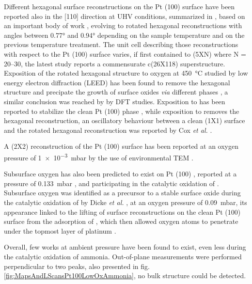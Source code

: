 Different hexagonal surface reconstructions on the Pt (100) surface have been reported also in the [110] direction at UHV conditions, summarized in \cite{Hammer2016}, based on an important body of work \parencite{Heilmann1979, VANHOVE1981, Heinz1982, Mase1992, Kuhnke1992, Borg1994, VanBeurden2004, Havu2010}, evolving to rotated hexagonal reconstructions with angles between \ang{0.77} and \ang{0.94} depending on the sample temperature and on the previous temperature treatment.
The unit cell describing those reconstructions with respect to the Pt (100) surface varies, if first contained to (5XN) where N = 20–30, the latest study reports a commensurate c(26X118) superstructure.
Exposition of the rotated hexagonal structure to oxygen at \qty{450}{\degreeCelsius} studied by low energy electron diffraction (LEED) has been found to remove the hexagonal structure and precipate the growth of surface oxides \textit{via} different phases \parencite{BradleyShumbera2007, BradleyShumbera2007a}, a similar conclusion was reached by \cite{Deskins2005} by DFT studies.
Exposition to  has been reported to stabilize the clean Pt (100) phase \parencite{Heinz1982}, while exposition to  removes the hexagonal reconstruction, an oscillatory behaviour between a clean (1X1) surface and the rotated hexagonal reconstruction was reported by Cox \textit{et al.} \parencite*{Cox1983}.

A (2X2) reconstruction of the Pt (100) surface has been reported at an oxygen pressure of \qty{1e-3}{mbar} by the use of environmental TEM \parencite{Li2016}.

Subsurface oxygen has also been predicted to exist on Pt (100) \parencite{Gu2007}, reported at a pressure of \qty{0.133}{\milli\bar} \parencite{McMillan2005}, and participating in the catalytic oxidation of .
Subsurface oxygen was identified as a precursor to a stable surface oxide during the catalytic oxidation of  by Dicke \textit{et al.} \parencite*{Dicke2000}, at an oxygen pressure of \qty{0.09}{\milli\bar}, its appearance linked to the lifting of surface reconstructions on the clean Pt (100) surface from the adsorption of , which then allowed oxygen atoms to penetrate under the topmost layer of platinum \parencite{Rotermund1993, LAUTERBACH1994}.

Overall, few works at ambient pressure have been found to exist, even less during the catalytic oxidation of ammonia.
Out-of-plane measurements were performed perpendicular to two peaks, also presented in fig. \ref{fig:MapsAndLScansPt100LowOxAmmonia}, no bulk structure could be detected.

